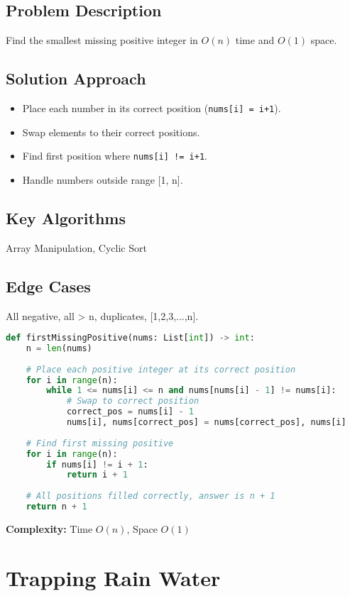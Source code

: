 \documentclass[10pt, a4paper]{article}
\begin{document}
\subsection*{Problem Description}
Find the smallest missing positive integer in $O(n)$ time and $O(1)$ space.

\subsection*{Solution Approach}
\begin{itemize}
    \item Place each number in its correct position (\texttt{nums[i] = i+1}).
    \item Swap elements to their correct positions.
    \item Find first position where \texttt{nums[i] != i+1}.
    \item Handle numbers outside range [1, n].
\end{itemize}

\subsection*{Key Algorithms}
Array Manipulation, Cyclic Sort

\subsection*{Edge Cases}
All negative, all > n, duplicates, [1,2,3,...,n].

\begin{lstlisting}[language=Python]
def firstMissingPositive(nums: List[int]) -> int:
    n = len(nums)
    
    # Place each positive integer at its correct position
    for i in range(n):
        while 1 <= nums[i] <= n and nums[nums[i] - 1] != nums[i]:
            # Swap to correct position
            correct_pos = nums[i] - 1
            nums[i], nums[correct_pos] = nums[correct_pos], nums[i]
    
    # Find first missing positive
    for i in range(n):
        if nums[i] != i + 1:
            return i + 1
    
    # All positions filled correctly, answer is n + 1
    return n + 1
\end{lstlisting}
\textbf{Complexity:} Time $O(n)$, Space $O(1)$

\section{Trapping Rain Water}
\end{document}
